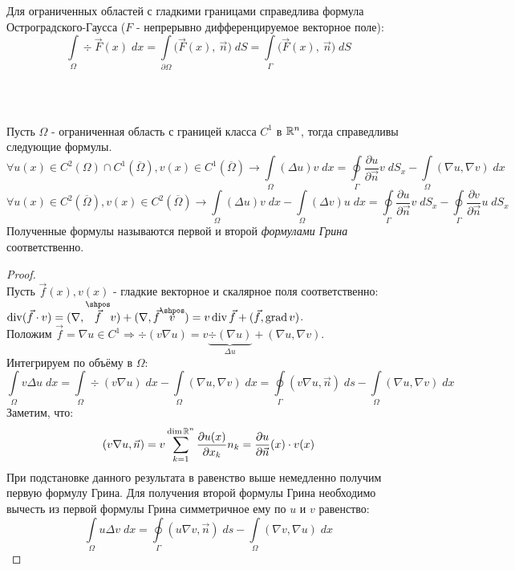 \documentclass[../main.tex]{subfiles}
\begin{document}
\begin{minipage}{0.8\textwidth}
Для ограниченных областей с гладкими границами справедлива формула Остроградского-Гаусса ($F$ - непрерывно дифференцируемое векторное поле):
$$\int\limits_{\Omega} \div \vec{F}(x)\;dx = \int\limits_{\partial \Omega} \bigl(\vec{F}(x),\: \vec{n}\bigr)\;dS = \int\limits_{\Gamma} \bigl(\vec{F}(x),\: \vec{n}\bigr)\;dS$$
\end{minipage} \\
\begin{lemma} \ \\
Пусть $\Omega$ - ограниченная область с границей класса $C^1$ в $\mathbb{R}^n$, тогда справедливы следующие формулы.
	$$\forall u(x) \in C^2(\Omega)\cap C^1(\overline{\Omega}), v(x) \in C^1(\overline{\Omega}) \to \int\limits_{\Omega} (\Delta u)v\; dx = \oint\limits_{\Gamma} \dfrac{\partial u}{\partial \vec{n}} v\;dS_x - \int\limits_{\Omega}(\nabla u, \nabla v)\;dx $$
$$ \forall u(x) \in C^2(\overline{\Omega}), v(x) \in C^2(\overline{\Omega}) \to \int\limits_{\Omega} (\Delta u)v\; dx - \int\limits_{\Omega} (\Delta v)u\; dx = \oint\limits_{\Gamma} \dfrac{\partial u}{\partial \vec{n}} v\;dS_x - \oint\limits_{\Gamma} \dfrac{\partial v}{\partial \vec{n}} u\;dS_x$$
Полученные формулы называются первой и второй\; \textit{формулами Грина} соответственно.
\end{lemma}
\begin{proof}\ \\
Пусть $\vec{f}(x), v(x)$ - гладкие векторное и скалярное поля соответственно: $\div(\vec{f} \cdot v) = (\nabla, \overset{\shpos}{\vec{f}}v) + (\nabla, \vec{f}\overset{\shpos}{v}) = v\div \vec{f} + (\vec{f}, \grad{v})$. \\
Положим $\vec{f} = \nabla u \in C^1 \Rightarrow \div (v \nabla u) = v \underbrace{\div(\nabla u)}_{\Delta u} + (\nabla u, \nabla v)$. \\
Интегрируем по объёму в $\Omega$:
\begin{equation*}
	\int\limits_{\Omega} v \Delta u\;dx = 	\int\limits_{\Omega} \div(v\nabla u)\;dx -\int\limits_{\Omega} (\nabla u, \nabla v)\;dx = \oint\limits_{\Gamma}(v \nabla u, \vec{n})\;ds - \int\limits_{\Omega}(\nabla u, \nabla v)\;dx
\end{equation*}
Заметим, что:
$$(v\nabla u, \vec{n}) = v \sum\limits_{k = 1}^{\dim \mathbb{R}^n}\dfrac{\partial u(x)}{\partial x_k} n_k = \dfrac{\partial u}{\partial \vec{n}}(x) \cdot v(x)$$
При подстановке данного результата в равенство выше немедленно получим первую формулу Грина.
Для получения второй формулы Грина необходимо вычесть из первой формулы Грина симметричное ему по $u$ и $v$ равенство:
$$\int\limits_{\Omega} u \Delta v\;dx = \oint\limits_{\Gamma}(u \nabla v, \vec{n})\;ds - \int\limits_{\Omega}(\nabla v, \nabla u)\;dx$$
\end{proof}
\end{document}
